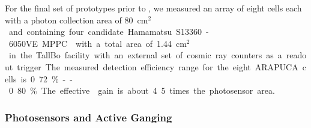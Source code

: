 

For the final set of prototypes prior to , we measured an array of eight  cells each with a photon collection area of \SI{80}{cm$^2$} and containing four candidate Hamamatsu S13360-6050VE MPPC  with a total area of \SI{1.44}{cm$^2$} in the TallBo facility with an external set of cosmic ray counters as a readout trigger.
The measured detection efficiency range for the eight ARAPUCA cells is 0.72\%--0.80\%. The effective  gain is about 4.5 times the photosensor area.


\subsubsection{Photosensors and Active Ganging}
\label{sec:pds-valid-ganging}

